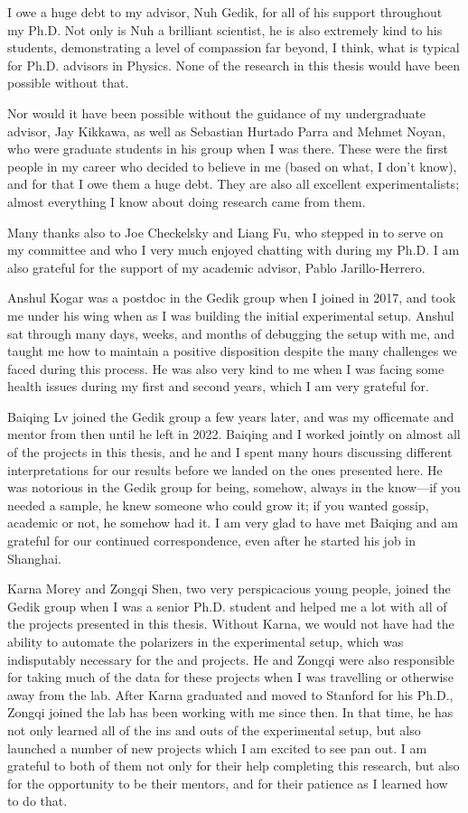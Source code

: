 I owe a huge debt to my advisor, Nuh Gedik, for all of his support throughout my Ph.D.
Not only is Nuh a brilliant scientist, he is also extremely kind to his students, demonstrating a level of compassion far beyond, I think, what is typical for Ph.D. advisors in Physics.
None of the research in this thesis would have been possible without that.

Nor would it have been possible without the guidance of my undergraduate advisor, Jay Kikkawa, as well as Sebastian Hurtado Parra and Mehmet Noyan, who were graduate students in his group when I was there.
These were the first people in my career who decided to believe in me (based on what, I don't know), and for that I owe them a huge debt.
They are also all excellent experimentalists; almost everything I know about doing research came from them.

Many thanks also to Joe Checkelsky and Liang Fu, who stepped in to serve on my committee and who I very much enjoyed chatting with during my Ph.D.
I am also grateful for the support of my academic advisor, Pablo Jarillo-Herrero.

Anshul Kogar was a postdoc in the Gedik group when I joined in \num{2017}, and took me under his wing when as I was building the initial experimental setup.
Anshul sat through many days, weeks, and months of debugging the setup with me, and taught me how to maintain a positive disposition despite the many challenges we faced during this process.
He was also very kind to me when I was facing some health issues during my first and second years, which I am very grateful for.

Baiqing Lv joined the Gedik group a few years later, and was my officemate and mentor from then until he left in \num{2022}.
Baiqing and I worked jointly on almost all of the projects in this thesis, and he and I spent many hours discussing different interpretations for our results before we landed on the ones presented here.
He was notorious in the Gedik group for being, somehow, always in the know---if you needed a sample, he knew someone who could grow it; if you wanted gossip, academic or not, he somehow had it.
I am very glad to have met Baiqing and am grateful for our continued correspondence, even after he started his job in Shanghai.

Karna Morey and Zongqi Shen, two very perspicacious young people, joined the Gedik group when I was a senior Ph.D. student and helped me a lot with all of the projects presented in this thesis.
Without Karna, we would not have had the ability to automate the polarizers in the experimental setup, which was indisputably necessary for the  and  projects.
He and Zongqi were also responsible for taking much of the data for these projects when I was travelling or otherwise away from the lab.
After Karna graduated and moved to Stanford for his Ph.D., Zongqi joined the lab has been working with me since then.
In that time, he has not only learned all of the ins and outs of the experimental setup, but also launched a number of new projects which I am excited to see pan out.
I am grateful to both of them not only for their help completing this research, but also for the opportunity to be their mentors, and for their patience as I learned how to do that.

